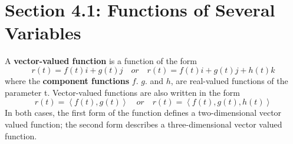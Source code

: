 \documentclass{article}
\title{
    \vspace{2in}
    \textmd{\textbf{\notesClass}}\\
    \normalsize\vspace{0.1in}\small{\notesDate}\\
    \vspace{0.1in}\large{\textit{\classInstructor}}
    \vspace{3in}
}
\author{\authorName}
\date{}
\newcommand{\newsection}[3][2]{\section{Section #2: #3}}
\begin{document}
\maketitle

\pagebreak

\newsection{4.1}{Functions of Several Variables}

\begin{definition}
	A \textbf{vector-valued function} is a function of the form
	$$r(t) = f(t)i + g(t)j \quad or \quad r(t) = f(t)i + g(t)j + h(t)k$$
	where the \textbf{component functions} $f$. $g$. and $h$, are real-valued functions of the parameter t. Vector-valued functions are also written in the form
	$$r(t) = \left< f(t), g(t) \right> \quad or \quad r(t) = \left< f(t), g(t), h(t) \right>$$
	In both cases, the first form of the function defines a two-dimensional vector valued function; the second form describes a three-dimensional vector valued function.
\end{definition}
\end{document}
